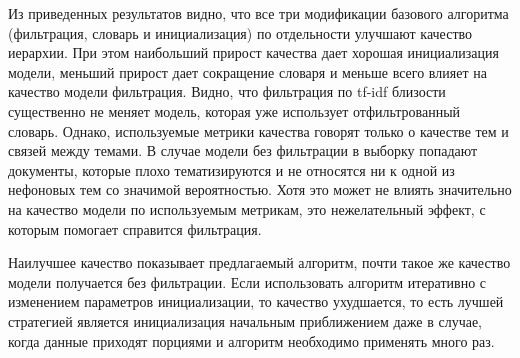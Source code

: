 Из приведенных результатов видно, что все три модификации базового алгоритма (фильтрация, словарь и инициализация) по отдельности улучшают качество иерархии. При этом наибольший прирост качества дает хорошая инициализация модели, меньший прирост дает сокращение словаря и меньше всего влияет на качество модели фильтрация. Видно, что фильтрация по tf-idf близости существенно не меняет модель, которая уже использует отфильтрованный словарь. Однако, используемые метрики качества говорят только о качестве тем и связей между темами. В случае модели без фильтрации в выборку попадают документы, которые плохо тематизируются и не относятся ни к одной из нефоновых тем со значимой вероятностью. Хотя это может не влиять значительно на качество модели по используемым метрикам, это нежелательный эффект, с которым помогает справится фильтрация.  

Наилучшее качество показывает предлагаемый алгоритм, почти такое же качество модели получается без фильтрации. Если использовать алгоритм итеративно с изменением параметров инициализации, то качество ухудшается, то есть лучшей стратегией является инициализация начальным приближением даже в случае, когда данные приходят порциями и алгоритм необходимо применять много раз.


